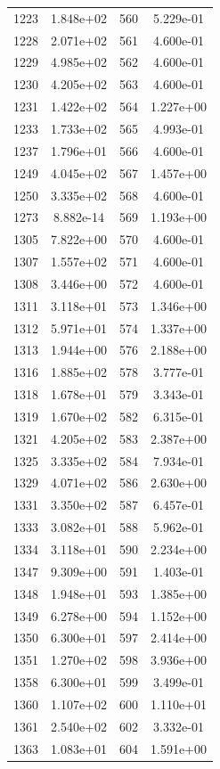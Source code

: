 \documentclass[12pt]{article}
\begin{document}
\begin{longtable}{@{}cccc@{}}
1223 & 1.848e+02 & 560 & 5.229e-01 \\
1228 & 2.071e+02 & 561 & 4.600e-01 \\
1229 & 4.985e+02 & 562 & 4.600e-01 \\
1230 & 4.205e+02 & 563 & 4.600e-01 \\
1231 & 1.422e+02 & 564 & 1.227e+00 \\
1233 & 1.733e+02 & 565 & 4.993e-01 \\
1237 & 1.796e+01 & 566 & 4.600e-01 \\
1249 & 4.045e+02 & 567 & 1.457e+00 \\
1250 & 3.335e+02 & 568 & 4.600e-01 \\
1273 & 8.882e-14 & 569 & 1.193e+00 \\
1305 & 7.822e+00 & 570 & 4.600e-01 \\
1307 & 1.557e+02 & 571 & 4.600e-01 \\
1308 & 3.446e+00 & 572 & 4.600e-01 \\
1311 & 3.118e+01 & 573 & 1.346e+00 \\
1312 & 5.971e+01 & 574 & 1.337e+00 \\
1313 & 1.944e+00 & 576 & 2.188e+00 \\
1316 & 1.885e+02 & 578 & 3.777e-01 \\
1318 & 1.678e+01 & 579 & 3.343e-01 \\
1319 & 1.670e+02 & 582 & 6.315e-01 \\
1321 & 4.205e+02 & 583 & 2.387e+00 \\
1325 & 3.335e+02 & 584 & 7.934e-01 \\
1329 & 4.071e+02 & 586 & 2.630e+00 \\
1331 & 3.350e+02 & 587 & 6.457e-01 \\
1333 & 3.082e+01 & 588 & 5.962e-01 \\
1334 & 3.118e+01 & 590 & 2.234e+00 \\
1347 & 9.309e+00 & 591 & 1.403e-01 \\
1348 & 1.948e+01 & 593 & 1.385e+00 \\
1349 & 6.278e+00 & 594 & 1.152e+00 \\
1350 & 6.300e+01 & 597 & 2.414e+00 \\
1351 & 1.270e+02 & 598 & 3.936e+00 \\
1358 & 6.300e+01 & 599 & 3.499e-01 \\
1360 & 1.107e+02 & 600 & 1.110e+01 \\
1361 & 2.540e+02 & 602 & 3.332e-01 \\
1363 & 1.083e+01 & 604 & 1.591e+00 \\

\end{longtable}
\end{document}
